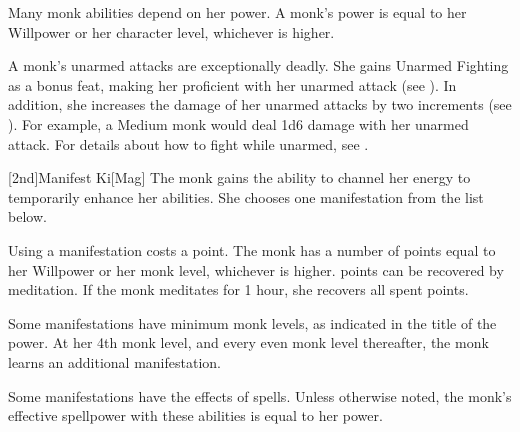         Many monk abilities depend on her \ki power.
        A monk's \ki power is equal to her Willpower or her character level, whichever is higher.

        A monk's unarmed attacks are exceptionally deadly.
        She gains Unarmed Fighting as a bonus feat, making her proficient with her unarmed attack (see ).
        In addition, she increases the damage of her unarmed attacks by two increments (see ).
        For example, a Medium monk would deal 1d6 damage with her unarmed attack.
        For details about how to fight while unarmed, see .

        [2nd]{Manifest Ki}[Mag]
        The monk gains the ability to channel her \ki energy to temporarily enhance her abilities.
        She chooses one \ki manifestation from the list below.

        Using a \ki manifestation costs a \ki point.
        The monk has a number of \ki points equal to her Willpower or her monk level, whichever is higher.
        \Ki points can be recovered by meditation.
        If the monk meditates for 1 hour, she recovers all spent \ki points.

        Some \ki manifestations have minimum monk levels, as indicated in the title of the power.
        At her 4th monk level, and every even monk level thereafter, the monk learns an additional \ki manifestation.

        Some \ki manifestations have the effects of spells.
        Unless otherwise noted, the monk's effective spellpower with these abilities is equal to her \ki power.

